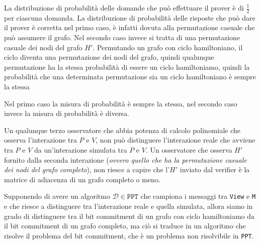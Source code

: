 La distribuzione di probabilità delle domande che può effettuare il prover è di $\frac{1}{2}$ per ciascuna domanda.
La distribuzione di probabilità delle risposte che può dare il prover è corretta nel primo caso, è infatti 
dovuta alla permutazione casuale che può assumere il grafo. Nel secondo caso invece si tratta di una permutazione 
casuale dei nodi del grafo $H'$.
Permutando un grafo con ciclo hamiltoniano, il ciclo diventa una permutazione 
dei nodi del grafo, quindi qualunque permutazione ha la stessa probabilità di essere un ciclo hamiltoniamo, quindi 
la probabilità 
che una determinata permutazione sia un ciclo hamiltoniano è sempre la stessa

Nel primo caso la misura di probabilità è sempre la stessa, nel secondo caso invece la misura di probabilità è diversa.

Un qualunque terzo osservatore che abbia potenza di calcolo polinomiale
che osserva l'interazione tra $P$ e $V$, non può distinguere
l'interazione reale che avviene tra $P$ e $V$ da un'interazione simulata tra $P$ e $V$. Un osservatore che osserva $H'$
fornito dalla seconda interazione (\textit{ovvero quello che ha la permutazione casuale dei nodi del grafo completo}),
non riesce a capire che l'$H'$ inviato dal verifier è la matrice di adiacenza di un grafo completo o meno.

Supponendo di avere un algoritmo $\mathcal{D} \in \texttt{PPT}$ che campiona i messaggi tra \texttt{View} e \texttt{M}
e che riesce a distinguere tra l'interazione reale e quella simulata, allora siamo in grado di distinguere tra 
il bit commitment di un grafo con ciclo hamiltoniamo da il bit commitment di un grafo completo, ma ciò si traduce 
in un algoritmo che risolve il problema del bit commitment, che è un problema non risolvibile in \texttt{PPT}.

